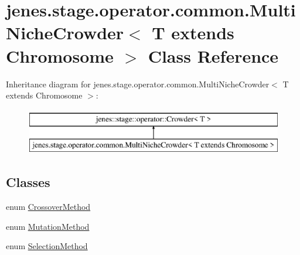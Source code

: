 \hypertarget{classjenes_1_1stage_1_1operator_1_1common_1_1_multi_niche_crowder_3_01_t_01extends_01_chromosome_01_4}{\section{jenes.\-stage.\-operator.\-common.\-Multi\-Niche\-Crowder$<$ T extends Chromosome $>$ Class Reference}
\label{classjenes_1_1stage_1_1operator_1_1common_1_1_multi_niche_crowder_3_01_t_01extends_01_chromosome_01_4}
}
Inheritance diagram for jenes.\-stage.\-operator.\-common.\-Multi\-Niche\-Crowder$<$ T extends Chromosome $>$\-:\begin{figure}[H]
\begin{center}
\leavevmode
\includegraphics[height=2.000000cm]{classjenes_1_1stage_1_1operator_1_1common_1_1_multi_niche_crowder_3_01_t_01extends_01_chromosome_01_4}
\end{center}
\end{figure}
\subsection*{Classes}
\begin{DoxyCompactItemize}
\item 
enum \hyperlink{enumjenes_1_1stage_1_1operator_1_1common_1_1_multi_niche_crowder_3_01_t_01extends_01_chromosome_01_4_1_1_crossover_method}{Crossover\-Method}
\item 
enum \hyperlink{enumjenes_1_1stage_1_1operator_1_1common_1_1_multi_niche_crowder_3_01_t_01extends_01_chromosome_01_4_1_1_mutation_method}{Mutation\-Method}
\item 
enum \hyperlink{enumjenes_1_1stage_1_1operator_1_1common_1_1_multi_niche_crowder_3_01_t_01extends_01_chromosome_01_4_1_1_selection_method}{Selection\-Method}
\end{DoxyCompactItemize}
